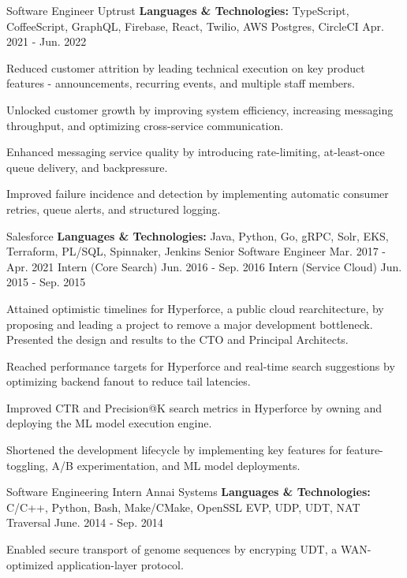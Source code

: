 
\begin{cventries}
  \cventry
    {Software Engineer}
    {Uptrust}
    {\textbf{Languages \& Technologies:} TypeScript, CoffeeScript, GraphQL, Firebase, React, Twilio, AWS Postgres, CircleCI}
    {Apr. 2021 - Jun. 2022}
    {
      \begin{cvitems}
        \item {Reduced customer attrition by leading technical execution on key product features - announcements, recurring events, and multiple staff members.}
        \item {Unlocked customer growth by improving system efficiency, increasing messaging throughput, and optimizing cross-service communication.}
        \item {Enhanced messaging service quality by introducing rate-limiting, at-least-once queue delivery, and backpressure.}
        \item {Improved failure incidence and detection by implementing automatic consumer retries, queue alerts, and structured logging.}
      \end{cvitems}
    }

  \cvthreeentry
    {Salesforce}
    {\textbf{Languages \& Technologies:} Java, Python, Go, gRPC, Solr, EKS, Terraform, PL/SQL, Spinnaker, Jenkins}
    {Senior Software Engineer}
    {Mar. 2017 - Apr. 2021}
    {Intern (Core Search)}
    {Jun. 2016 - Sep. 2016}
    {Intern (Service Cloud)}
    {Jun. 2015 - Sep. 2015}
    {
      \begin{cvitems}
        \item {Attained optimistic timelines for Hyperforce, a public cloud rearchitecture, by proposing and leading a project to remove a major development bottleneck. Presented the design and results to the CTO and Principal Architects.}
        \item {Reached performance targets for Hyperforce and real-time search suggestions by optimizing backend fanout to reduce tail latencies.}
        \item {Improved CTR and Precision@K search metrics in Hyperforce by owning and deploying the ML model execution engine.}
        \item {Shortened the development lifecycle by implementing key features for feature-toggling, A/B experimentation, and ML model deployments.}
      \end{cvitems}
    }

  \cventry
    {Software Engineering Intern}
    {Annai Systems}
    {\textbf{Languages \& Technologies:} C/C++, Python, Bash, Make/CMake, OpenSSL EVP, UDP, UDT, NAT Traversal}
    {June. 2014 - Sep. 2014}
    {
      \begin{cvitems}
        \item {Enabled secure transport of genome sequences by encryping UDT, a WAN-optimized application-layer protocol.}
      \end{cvitems}
    }
\end{cventries}
